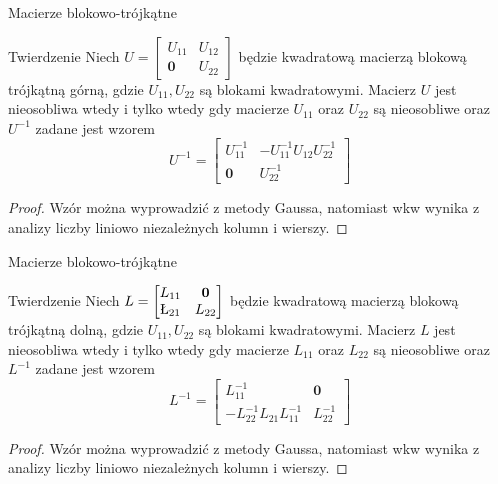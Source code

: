 \documentclass{beamer}
\newcommand{\zero}{\mathbf{0}}
\begin{document}
\begin{frame}{Macierze blokowo-trójkątne}
    \begin{block}{Twierdzenie}
        Niech $U = \begin{bmatrix}
            U_{11} & U_{12} \\ \zero & U_{22}
        \end{bmatrix}$
        będzie kwadratową macierzą blokową trójkątną górną, gdzie $U_{11}, U_{22}$ są blokami kwadratowymi. Macierz $U$ jest nieosobliwa wtedy i tylko wtedy 
        gdy macierze $U_{11}$ oraz  $U_{22}$ są nieosobliwe oraz $U^{-1}$ zadane jest wzorem
        $$ U^{-1} = \begin{bmatrix}
            U_{11}^{-1} & -U_{11}^{-1} U_{12} U _{22}^{-1} \\ \zero & U_{22}^{-1}
        \end{bmatrix}$$
    \end{block}
    \pause 
    \begin{proof}
        Wzór można wyprowadzić z metody Gaussa, 
        natomiast wkw wynika z analizy liczby liniowo niezależnych kolumn i wierszy.
    \end{proof}
\end{frame}

\begin{frame}{Macierze blokowo-trójkątne}
    \begin{block}{Twierdzenie}
        Niech $L = \begin{bmatrix}
            L_{11} & \zero \\ \L_{21} & L_{22}
        \end{bmatrix}$
        będzie kwadratową macierzą blokową trójkątną dolną, gdzie $U_{11}, U_{22}$ są blokami kwadratowymi. Macierz $L$ jest nieosobliwa wtedy i tylko wtedy 
        gdy macierze $L_{11}$ oraz  $L_{22}$ są nieosobliwe oraz $L^{-1}$ zadane jest wzorem
        $$ L^{-1} = \begin{bmatrix}
            L_{11}^{-1} & \zero\\ -L_{22}^{-1} L_{21} L _{11}^{-1}  & L_{22}^{-1}
        \end{bmatrix}$$
    \end{block}
    \pause 
    \begin{proof}
        Wzór można wyprowadzić z metody Gaussa, 
        natomiast wkw wynika z analizy liczby liniowo niezależnych kolumn i wierszy.
    \end{proof}
\end{frame}
\end{document}
